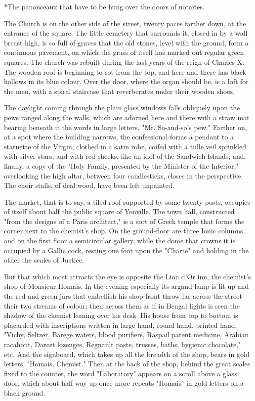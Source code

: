 \documentclass{tufte-book}
\begin{document}
     *The panonceaux that have to be hung over the doors of
     notaries.

The Church is on the other side of the street, twenty paces farther
down, at the entrance of the square. The little cemetery that surrounds
it, closed in by a wall breast high, is so full of graves that the old
stones, level with the ground, form a continuous pavement, on which the
grass of itself has marked out regular green squares. The church was
rebuilt during the last years of the reign of Charles X. The wooden roof
is beginning to rot from the top, and here and there has black hollows
in its blue colour. Over the door, where the organ should be, is a
loft for the men, with a spiral staircase that reverberates under their
wooden shoes.

The daylight coming through the plain glass windows falls obliquely upon
the pews ranged along the walls, which are adorned here and there with
a straw mat bearing beneath it the words in large letters, "Mr.
So-and-so's pew." Farther on, at a spot where the building narrows, the
confessional forms a pendant to a statuette of the Virgin, clothed in
a satin robe, coifed with a tulle veil sprinkled with silver stars, and
with red cheeks, like an idol of the Sandwich Islands; and, finally, a
copy of the "Holy Family, presented by the Minister of the Interior,"
overlooking the high altar, between four candlesticks, closes in the
perspective. The choir stalls, of deal wood, have been left unpainted.

The market, that is to say, a tiled roof supported by some twenty posts,
occupies of itself about half the public square of Yonville. The town
hall, constructed "from the designs of a Paris architect," is a sort of
Greek temple that forms the corner next to the chemist's shop. On
the ground-floor are three Ionic columns and on the first floor a
semicircular gallery, while the dome that crowns it is occupied by a
Gallic cock, resting one foot upon the "Charte" and holding in the other
the scales of Justice.

But that which most attracts the eye is opposite the Lion d'Or inn, the
chemist's shop of Monsieur Homais. In the evening especially its argand
lamp is lit up and the red and green jars that embellish his shop-front
throw far across the street their two streams of colour; then across
them as if in Bengal lights is seen the shadow of the chemist
leaning over his desk. His house from top to bottom is placarded with
inscriptions written in large hand, round hand, printed hand: "Vichy,
Seltzer, Barege waters, blood purifiers, Raspail patent medicine,
Arabian racahout, Darcet lozenges, Regnault paste, trusses, baths,
hygienic chocolate," etc. And the signboard, which takes up all the
breadth of the shop, bears in gold letters, "Homais, Chemist." Then at
the back of the shop, behind the great scales fixed to the counter, the
word "Laboratory" appears on a scroll above a glass door, which about
half-way up once more repeats "Homais" in gold letters on a black
ground.
\end{document}
